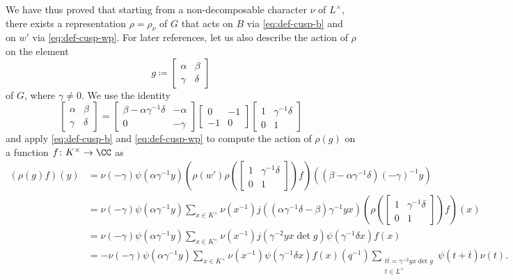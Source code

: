 \documentclass[../main.tex]{subfiles}
\begin{document}
We have thus proved that starting from a non-decomposable character $\nu$ of $L^\times$, there exists a representation $\rho=\rho_\nu$ of $G$ that acts on $B$ via \eqref{eq:def-cusp-b} and on $w'$ via \eqref{eq:def-cusp-wp}. For later references, let us also describe the action of $\rho$ on the element
\begin{equation}
	g\coloneqq\begin{bmatrix}
		\alpha & \beta \\
		\gamma & \delta
	\end{bmatrix} \label{eq:g-notin-b}
\end{equation}
of $G$, where $\gamma\ne0$. We use the identity
\[\begin{bmatrix}
	\alpha & \beta \\
	\gamma & \delta
\end{bmatrix}=\begin{bmatrix}
	\beta-\alpha\gamma^{-1}\delta & -\alpha \\
	0 & -\gamma
\end{bmatrix}\begin{bmatrix}
	0 & -1 \\
	-1 & 0
\end{bmatrix}\begin{bmatrix}
	1 & \gamma^{-1}\delta \\
	0 & 1
\end{bmatrix}\]
and apply \eqref{eq:def-cusp-b} and \eqref{eq:def-cusp-wp} to compute the action of $\rho(g)$ on a function $f\colon K^\times\to\CC$ as
\begin{align*}
	(\rho(g)f)(y) &= \nu(-\gamma)\psi\left(\alpha\gamma^{-1}y\right)\left(\rho(w')\rho\left(\begin{bmatrix}
		1 & \gamma^{-1}\delta \\
		0 & 1
	\end{bmatrix}\right)f\right)\left(\left(\beta-\alpha\gamma^{-1}\delta\right)(-\gamma)^{-1}y\right) \\
	&= \nu(-\gamma)\psi\left(\alpha\gamma^{-1}y\right)\sum_{x\in K^\times}\nu\left(x^{-1}\right)j\left(\left(\alpha\gamma^{-1}\delta-\beta\right)\gamma^{-1}yx\right)\left(\rho\left(\begin{bmatrix}
		1 & \gamma^{-1}\delta \\
		0 & 1
	\end{bmatrix}\right)f\right)(x) \\
	&= \nu(-\gamma)\psi\left(\alpha\gamma^{-1}y\right)\sum_{x\in K^\times}\nu\left(x^{-1}\right)j\left(\gamma^{-2}yx\det g\right)\psi\left(\gamma^{-1}\delta x\right)f(x) \\
	&= -\nu(-\gamma)\psi\left(\alpha\gamma^{-1}y\right)\sum_{x\in K^\times}\nu\left(x^{-1}\right)\psi\left(\gamma^{-1}\delta x\right)f(x)\left(q^{-1}\right)\sum_{\substack{t\overline t=\gamma^{-2}yx\det g\\t\in L^\times}}\psi\left(t+\overline t\right)\nu(t).
\end{align*}
\end{document}
